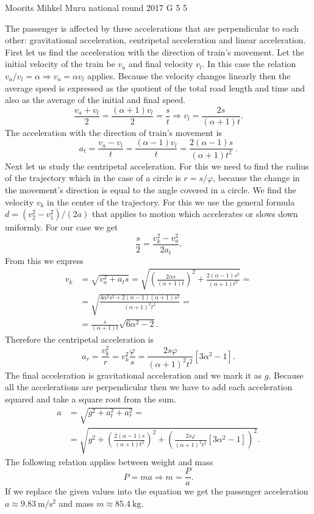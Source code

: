 \documentclass[11pt]{article}
\begin{document}
{Moorits Mihkel Muru} %
{national round} %
{2017} %
{G 5} %
{5} %
{

\ifEngSolution
The passenger is affected by three accelerations that are perpendicular to each other: gravitational acceleration, centripetal acceleration and linear acceleration. First let us find the acceleration with the direction of train’s movement. Let the initial velocity of the train be $v_a$ and final velocity $v_l$. In this case the relation $v_a/v_l=\alpha \Rightarrow v_a = \alpha v_l$ applies. Because the velocity changes linearly then the average speed is expressed as the quotient of the total road length and time and also as the average of the initial and final speed. 
\[ \frac{v_a + v_l}{2} = \frac{(\alpha + 1) v_l}{2} = \frac{s}{t} \Rightarrow v_l = \frac{2s}{(\alpha + 1)t}. \] 
The acceleration with the direction of train’s movement is
\[ a_t = \frac{v_a-v_l}{t} = \frac{(\alpha - 1) v_l}{t} = \frac{2(\alpha - 1)s}{(\alpha + 1)t^2} \ . \] 
Next let us study the centripetal acceleration. For this we need to find the radius of the trajectory which in the case of a circle is $r = s/\varphi$, because the change in the movement’s direction is equal to the angle covered in a circle. We find the velocity $v_k$ in the center of the trajectory. For this we use the general formula $d=(v_2^2-v_1^2)/(2a)$ that applies to motion which accelerates or slows down uniformly. For our case we get
\[\frac{s}{2} = \frac{v_k^2 - v_a^2}{2a_t}.\] 
From this we express
\begin{align*}
v_k &= \sqrt{v_a^2+a_t s} = \sqrt{\left(\frac{2\alpha s}{(\alpha+1)t}\right)^2 +\frac{2(\alpha - 1)s^2}{(\alpha+1)t^2}} =\\
&=\sqrt{\frac{4\alpha^2 s^2 + 2(\alpha-1)(\alpha+1)s^2}{(\alpha+1)^2 t^2}} =\\
&=\frac{s}{(\alpha+1)t} \sqrt{6\alpha^2-2}.
\end{align*} 
Therefore the centripetal acceleration is 
\[ a_r = \frac{v_k^2}{r} = v_k^2 \frac{\varphi}{s} = \frac{2s\varphi}{(\alpha+1)^2t^2} [3\alpha^2-1]. \] 
The final acceleration is gravitational acceleration and we mark it as $g$. Because all the accelerations are perpendicular then we have to add each acceleration squared and take a square root from the sum.
\begin{align*}
a &= \sqrt{ g^2 + a_t^2 + a_r^2 } =\\
&= \sqrt{ g^2 + \left(\frac{2(\alpha - 1)s}{(\alpha + 1)t^2}\right)^2 + \left(\frac{2s\varphi}{(\alpha+1)^2t^2} [3\alpha^2-1]\right)^2 }.
\end{align*} 
The following relation applies between weight and mass
\[ P = ma \Rightarrow m = \frac{P}{a}. \] 
If we replace the given values into the equation we get the passenger acceleration $a\approx\SI{9.83}{\meter\per\second\squared}$ and mass $m\approx\SI{85.4}{\kilogram}$.
\fi
}
\end{document}
